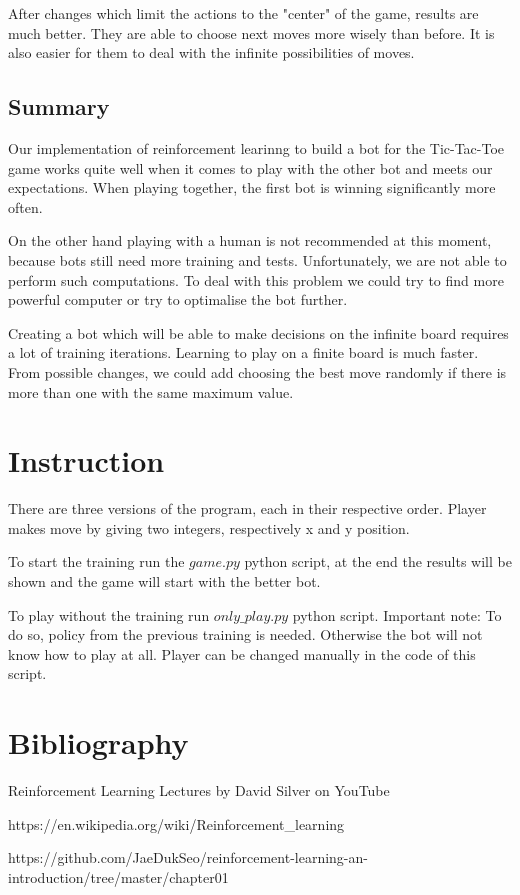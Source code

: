 \documentclass[a4paper,12pt]{book}
\begin{document}
After changes which limit the actions to the "center" of the game, results are much better. They are able to choose next moves more wisely than before. It is also easier for them to deal with the infinite possibilities of moves.

 	\section{Summary}

Our implementation of reinforcement learinng to build a bot for the Tic-Tac-Toe game works quite well when it comes to play with the other bot and meets our expectations. When playing together, the first bot is winning significantly more often. 

On the other hand playing with a human is not recommended at this moment, because bots still need more training and tests. Unfortunately, we are not able to perform such computations. To deal with this problem we could try to find more powerful computer or try to optimalise the bot further. 

Creating a bot which will be able to make decisions on the infinite board requires a lot of training iterations. Learning to play on a finite board is much faster. From possible changes, we could add choosing the best move randomly if there is more than one with the same maximum value.

	\chapter{Instruction}

There are three versions of the program, each in their respective order. Player makes move by giving two integers, respectively x and y position.

To start the training run the $game.py$ python script, at the end the results will be shown and the game will start with the better bot.

To play without the training run $only\_play.py$ python script. Important note: To do so, policy from the previous training is needed. Otherwise the bot will not know how to play at all. Player can be changed manually in the code of this script.

	\chapter{Bibliography}

\begin{description}
	\item Reinforcement Learning Lectures by David Silver on YouTube
	\item https://en.wikipedia.org/wiki/Reinforcement\_learning
	\item https://github.com/JaeDukSeo/reinforcement-learning-an-introduction/tree/master/chapter01
\end{description}


	\backmatter
	
\end{document}
